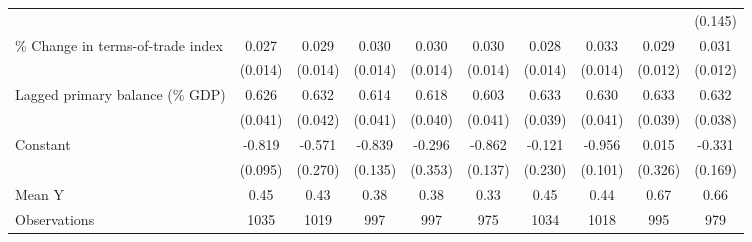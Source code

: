 {\begin{tabular}{l*{9}{c}}
                    &                     &                     &                     &                     &                     &                     &                     &                     &     (0.145)         \\
\addlinespace
\% Change in terms-of-trade index&       0.027\sym{*}  &       0.029\sym{**} &       0.030\sym{**} &       0.030\sym{**} &       0.030\sym{**} &       0.028\sym{**} &       0.033\sym{**} &       0.029\sym{**} &       0.031\sym{**} \\
                    &     (0.014)         &     (0.014)         &     (0.014)         &     (0.014)         &     (0.014)         &     (0.014)         &     (0.014)         &     (0.012)         &     (0.012)         \\
\addlinespace
Lagged primary balance (\% GDP)&       0.626\sym{***}&       0.632\sym{***}&       0.614\sym{***}&       0.618\sym{***}&       0.603\sym{***}&       0.633\sym{***}&       0.630\sym{***}&       0.633\sym{***}&       0.632\sym{***}\\
                    &     (0.041)         &     (0.042)         &     (0.041)         &     (0.040)         &     (0.041)         &     (0.039)         &     (0.041)         &     (0.039)         &     (0.038)         \\
\addlinespace
Constant            &      -0.819\sym{***}&      -0.571\sym{**} &      -0.839\sym{***}&      -0.296         &      -0.862\sym{***}&      -0.121         &      -0.956\sym{***}&       0.015         &      -0.331\sym{*}  \\
                    &     (0.095)         &     (0.270)         &     (0.135)         &     (0.353)         &     (0.137)         &     (0.230)         &     (0.101)         &     (0.326)         &     (0.169)         \\
\midrule
Mean Y              &        0.45         &        0.43         &        0.38         &        0.38         &        0.33         &        0.45         &        0.44         &        0.67         &        0.66         \\
Observations        &        1035         &        1019         &         997         &         997         &         975         &        1034         &        1018         &         995         &         979         \\
\bottomrule
\end{tabular}
}
